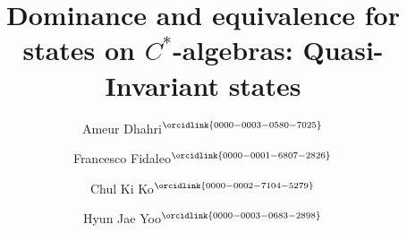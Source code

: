 \documentclass[12pt]{amsart}
\numberwithin{equation}{section}
\begin{document}
\title[quasi-invariant states]
{Dominance and equivalence for states on $C^*$-algebras: Quasi-Invariant states}

\author[A. Dhahri, F. Fidaleo, C. K. Ko, H. J. Yoo]{Ameur Dhahri${}^{\orcidlink{0000-0003-0580-7025}}$}
\address{Ameur Dhahri\\
Mathematics Department \\
Politecnico di Milano\\
Piazza Leonardo da Vinci 32, I - 20133 Milano, Italy} 
\author[]{Francesco Fidaleo${}^{\orcidlink{0000-0001-6807-2826}}$}
\address{Francesco Fidaleo\\
Dipartimento di Matematica \\
Universit\`{a} di Roma Tor Vergata\\
Via della Ricerca Scientifica 1, Roma 00133, Italy} 
\author[]{Chul Ki Ko${}^{\orcidlink{0000-0002-7104-5279}}$}
\address{Chul Ki Ko\\
University College\\
Yonsei University\\
85 Songdogwahak-ro, Yeonsu-gu, Incheon 21983, Korea} 
\author[]{Hyun Jae Yoo${}^{\orcidlink{ 0000-0003-0683-2898}}$}
\address{Hyun Jae Yoo\\
Department of Applied Mathematics and Institute for Integrated Mathematical Sciences \\
Hankyong National University\\
327 Jungang-ro, Anseong-si, Gyeonggi-do 17579, Korea} 
\end{document}
